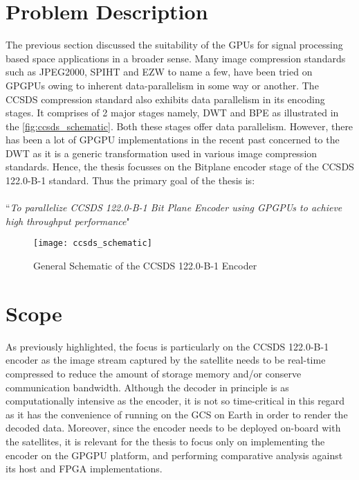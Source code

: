 \section{Problem Description\label{sec:probdesc}}
The previous section discussed the suitability of the GPUs for signal processing based space applications in a broader sense. Many image compression standards such as JPEG2000, SPIHT and EZW to name a few, have been tried on \glspl{GPGPU} owing to inherent data-parallelism in some way or another. The \gls{CCSDS} compression standard also exhibits data parallelism in its encoding stages. It comprises of 2 major stages namely, \gls{DWT} and \gls{BPE} as illustrated in the \autoref{fig:ccsds_schematic}. Both these stages offer data parallelism. However, there has been a lot of \gls{GPGPU} implementations in the recent past concerned to the \gls{DWT} as it is a generic transformation used in various image compression standards. Hence, the thesis focusses on the Bitplane encoder stage of the \gls{CCSDS} 122.0-B-1 standard. Thus the primary goal of the thesis is:
\\
\\
``\textit{To parallelize \gls{CCSDS} 122.0-B-1 Bit Plane Encoder using GPGPUs to achieve high throughput performance}"
\begin{figure}
    \centering
    \texttt{[image: ccsds\_schematic]}\\
    \caption{General Schematic of the \gls{CCSDS} 122.0-B-1 Encoder\cite{CCSDS122blue}}\label{fig:ccsds_schematic}
\end{figure}

\section{Scope\label{sec:scope}}
As previously highlighted, the focus is particularly on the \gls{CCSDS} 122.0-B-1 encoder as the image stream captured by the satellite needs to be real-time compressed to reduce the amount of storage memory and/or conserve communication bandwidth. Although the decoder in principle is as computationally intensive as the encoder, it is not so time-critical in this regard as it has the convenience of running on the \gls{GCS} on Earth in order to render the decoded data. Moreover, since the encoder needs to be deployed on-board with the satellites, it is relevant for the thesis to focus only on implementing the encoder on the \gls{GPGPU} platform, and performing comparative analysis against its host and \gls{FPGA} implementations.
